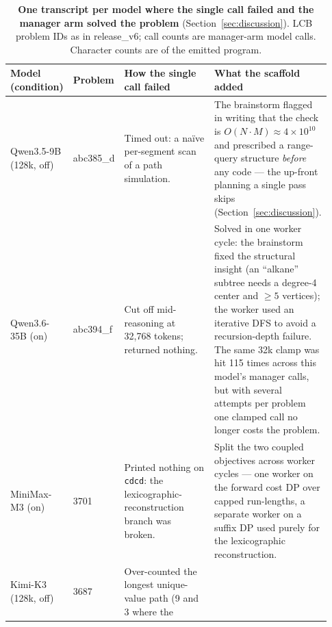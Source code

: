 \documentclass{article}
\begin{document}
\begin{table}[p]
\centering
\caption{\textbf{One transcript per model where the single call failed and the manager arm solved
the problem} (Section~\ref{sec:discussion}). LCB problem IDs as in release\_v6; call counts are
manager-arm model calls. Character counts are of the emitted program.}
\label{tab:transcripts}
\footnotesize
\setlength{\tabcolsep}{4pt}
\begin{tabular}{@{}p{0.155\linewidth}p{0.101\linewidth}p{0.310\linewidth}p{0.364\linewidth}@{}}
\toprule
\textbf{Model} \newline \textbf{(condition)} & \textbf{Problem} & \textbf{How the single call failed} &
\textbf{What the scaffold added} \\
\midrule
Qwen3.5-9B \newline (128k, off) & abc385\_d & Timed out: a na\"ive per-segment scan of a path
simulation. & The brainstorm flagged in writing that the check is $O(N\cdot M) \approx
4\times10^{10}$ and prescribed a range-query structure \emph{before} any code --- the up-front
planning a single pass skips (Section~\ref{sec:discussion}). \\
\addlinespace
Qwen3.6-35B \newline (on) & abc394\_f & Cut off mid-reasoning at 32,768 tokens; returned nothing. &
Solved in one worker cycle: the brainstorm fixed the structural insight (an ``alkane'' subtree needs
a degree-4 center and $\ge 5$ vertices); the worker used an iterative DFS to avoid a recursion-depth
failure. The same 32k clamp was hit 115 times across this model's manager calls, but with several
attempts per problem one clamped call no longer costs the problem. \\
\addlinespace
MiniMax-M3 \newline (on) & 3701 & Printed nothing on \texttt{cdcd}: the lexicographic-reconstruction
branch was broken. & Split the two coupled objectives across worker cycles --- one worker on the
forward cost DP over capped run-lengths, a separate worker on a suffix DP used purely for the
lexicographic reconstruction. \\
\addlinespace
Kimi-K3 \newline (128k, off) & 3687 & Over-counted the longest unique-value path (9 and 3 where the

\end{tabular}
\end{table}
\end{document}
